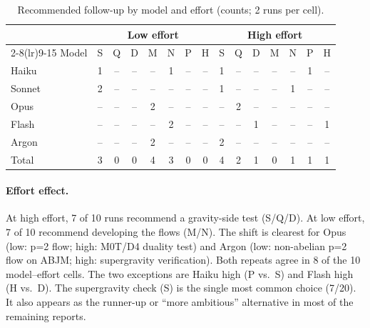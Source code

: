 \documentclass[11pt,a4paper]{article}
\begin{document}
\begin{table}[h]
\centering
\caption{Recommended follow-up by model and effort (counts; 2 runs per cell).}
\begin{tabular}{l ccccccc ccccccc}
\toprule
& \multicolumn{7}{c}{Low effort} & \multicolumn{7}{c}{High effort}\\
\cmidrule(lr){2-8}\cmidrule(lr){9-15}
Model & S & Q & D & M & N & P & H & S & Q & D & M & N & P & H\\
\midrule
Haiku  & 1 & -- & -- & -- & 1 & -- & -- & 1 & -- & -- & -- & -- & 1 & --\\
Sonnet & 2 & -- & -- & -- & -- & -- & -- & 1 & -- & -- & -- & 1 & -- & --\\
Opus   & -- & -- & -- & 2 & -- & -- & -- & -- & 2 & -- & -- & -- & -- & --\\
Flash  & -- & -- & -- & -- & 2 & -- & -- & -- & -- & 1 & -- & -- & -- & 1\\
Argon  & -- & -- & -- & 2 & -- & -- & -- & 2 & -- & -- & -- & -- & -- & --\\
\midrule
Total  & 3 & 0 & 0 & 4 & 3 & 0 & 0 & 4 & 2 & 1 & 0 & 1 & 1 & 1\\
\bottomrule
\end{tabular}
\end{table}

\paragraph{Effort effect.} At high effort, 7 of 10 runs recommend a gravity-side test (S/Q/D). At low effort, 7 of 10 recommend developing the flows (M/N). The shift is clearest for Opus (low: p=2 flow; high: M0T/D4 duality test) and Argon (low: non-abelian p=2 flow on ABJM; high: supergravity verification). Both repeats agree in 8 of the 10 model--effort cells. The two exceptions are Haiku high (P vs.\ S) and Flash high (H vs.\ D). The supergravity check (S) is the single most common choice (7/20). It also appears as the runner-up or ``more ambitious'' alternative in most of the remaining reports.
\end{document}
